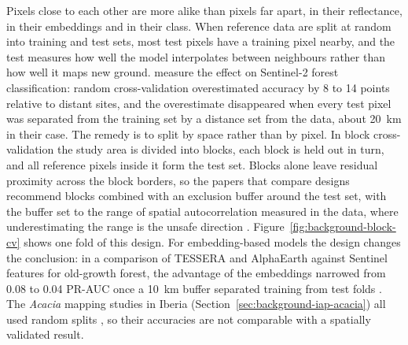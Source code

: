 Pixels close to each other are more alike than pixels far apart, in
their reflectance, in their embeddings and in their class. When
reference data are split at random into training and test sets, most
test pixels have a training pixel nearby, and the test measures how
well the model interpolates between neighbours rather than how well it
maps new ground. \citet{karasiak2022} measure the effect on Sentinel-2
forest classification: random cross-validation overestimated accuracy
by 8 to 14 points relative to distant sites, and the overestimate
disappeared when every test pixel was separated from the training set
by a distance set from the data, about 20~km in their case. The remedy
is to split by space rather than by pixel. In block cross-validation
the study area is divided into blocks, each block is held out in turn,
and all reference pixels inside it form the test set. Blocks alone
leave residual proximity across the block borders, so the papers that
compare designs recommend blocks combined with an exclusion buffer
around the test set, with the buffer set to the range of spatial
autocorrelation measured in the data, where underestimating the range
is the unsafe direction \cite{lerest2014,mahoney2023}.
Figure~\ref{fig:background-block-cv} shows one fold of this design.
For
embedding-based models the design changes the conclusion: in a
comparison of TESSERA and AlphaEarth against Sentinel features for
old-growth forest, the advantage of the embeddings narrowed from 0.08
to 0.04 PR-AUC once a 10~km buffer separated training from test folds
\cite{ratsakatika2026}. The \emph{Acacia} mapping studies in Iberia
(Section~\ref{sec:background-iap-acacia}) all used random
splits \cite{martins2016,mouta2021,domingo2023}, so their accuracies
are not comparable with a spatially validated result.

